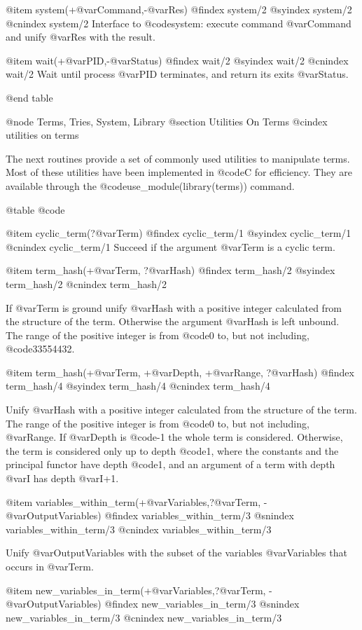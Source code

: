 {{{{{{{{{@item system(+@var{Command},-@var{Res})
@findex  system/2
@syindex system/2
@cnindex system/2
Interface to @code{system}: execute command @var{Command} and unify
@var{Res} with the result.

@item wait(+@var{PID},-@var{Status})
@findex  wait/2
@syindex wait/2
@cnindex wait/2
Wait until process @var{PID} terminates, and return its exits @var{Status}.

@end table


@node Terms, Tries, System, Library
@section Utilities On Terms
@cindex utilities on terms

The next routines provide a set of commonly used utilities to manipulate
terms. Most of these utilities have been implemented in @code{C} for
efficiency. They are available through the
@code{use_module(library(terms))} command.

@table @code

@item cyclic_term(?@var{Term})
@findex cyclic_term/1
@syindex cyclic_term/1
@cnindex cyclic_term/1
Succeed if the argument @var{Term} is a cyclic term.

@item term_hash(+@var{Term}, ?@var{Hash})
@findex  term_hash/2
@syindex term_hash/2
@cnindex term_hash/2

If @var{Term} is ground unify @var{Hash} with a positive integer
calculated from the structure of the term. Otherwise the argument
@var{Hash} is left unbound. The range of the positive integer is from
@code{0} to, but not including, @code{33554432}.

@item term_hash(+@var{Term}, +@var{Depth}, +@var{Range}, ?@var{Hash})
@findex  term_hash/4
@syindex term_hash/4
@cnindex term_hash/4

Unify @var{Hash} with a positive integer calculated from the structure
of the term.  The range of the positive integer is from @code{0} to, but
not including, @var{Range}. If @var{Depth} is @code{-1} the whole term
is considered. Otherwise, the term is considered only up to depth
@code{1}, where the constants and the principal functor have depth
@code{1}, and an argument of a term with depth @var{I} has depth @var{I+1}. 

@item variables_within_term(+@var{Variables},?@var{Term}, -@var{OutputVariables})
@findex  variables_within_term/3
@snindex variables_within_term/3 
@cnindex variables_within_term/3  

Unify @var{OutputVariables} with the subset of the variables @var{Variables} that occurs in @var{Term}.

@item new_variables_in_term(+@var{Variables},?@var{Term}, -@var{OutputVariables})
@findex  new_variables_in_term/3
@snindex new_variables_in_term/3 
@cnindex new_variables_in_term/3  

}}}}}}}}}
